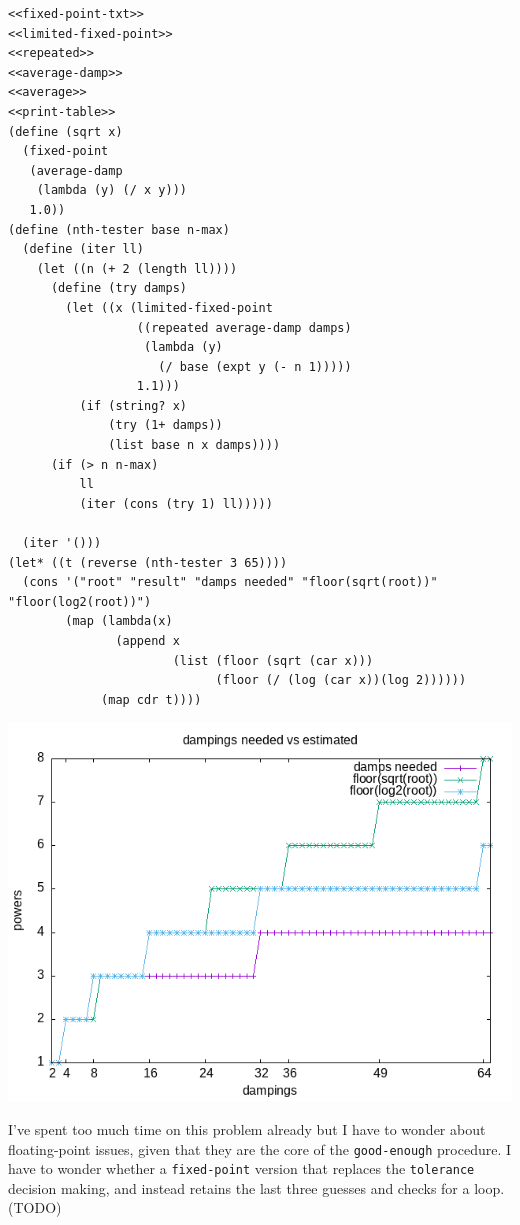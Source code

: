 \documentclass[final,fleqn,titlepage,twoside]{article}
\begin{document}
\begin{verbatim}
<<fixed-point-txt>>
<<limited-fixed-point>>
<<repeated>>
<<average-damp>>
<<average>>
<<print-table>>
(define (sqrt x)
  (fixed-point
   (average-damp
    (lambda (y) (/ x y)))
   1.0))
(define (nth-tester base n-max)
  (define (iter ll)
    (let ((n (+ 2 (length ll))))
      (define (try damps)
        (let ((x (limited-fixed-point
                  ((repeated average-damp damps)
                   (lambda (y)
                     (/ base (expt y (- n 1)))))
                  1.1)))
          (if (string? x)
              (try (1+ damps))
              (list base n x damps))))
      (if (> n n-max)
          ll
          (iter (cons (try 1) ll)))))

  (iter '()))
(let* ((t (reverse (nth-tester 3 65))))
  (cons '("root" "result" "damps needed" "floor(sqrt(root))" "floor(log2(root))")
        (map (lambda(x)
               (append x
                       (list (floor (sqrt (car x)))
                             (floor (/ (log (car x))(log 2))))))
             (map cdr t))))
\end{verbatim}

\begin{center}
\includegraphics[width=.9\linewidth]{1/fig/1-45-1.png}
\end{center}

I've spent too much time on this problem already but I have to wonder about
floating-point issues, given that they are the core of the
\texttt{good-enough} procedure. I have to wonder whether a
\texttt{fixed-point} version that replaces the \texttt{tolerance} decision
making, and instead retains the last three guesses and checks for a loop. (TODO)
\end{document}
